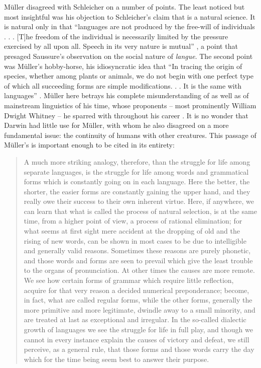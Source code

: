 \documentclass[output=paper,
modfonts
]{LSP/langsci}
\begin{document}
Müller disagreed with Schleicher on a number of points.  
The least noticed but most insightful was his objection to Schleicher's claim that  is a natural science.
It is natural only in that ``languages are not produced by the free-will of individuals . . . 
[T]he freedom of the individual is necessarily limited by the pressure exercised by all upon all. 
Speech in its very nature is mutual'' \citep[258]{muller1870}, a point that presaged Saussure's observation on the social nature of \textit{langue}. The second point was Müller's hobby-horse, his idiosyncratic idea that ``In tracing the origin of species, whether among plants or animals, we do not begin with one perfect type of which all succeeding forms are simple modifications. . . It is the same with languages'' \citep[258]{muller1870}. Müller here betrays his complete misunderstanding of  as well as of mainstream linguistics of his time, whose proponents -- most prominently William Dwight Whitney -- he sparred with throughout his career \citep{Whitney1875,alter1999}. It is no wonder that Darwin had little use for Müller, with whom he also disagreed on a more fundamental issue: the continuity of humans with other creatures. This passage of Müller's is important enough to be cited in its entirety:

\begin{quote}
A much more striking analogy, therefore, than the struggle for life among separate languages, is the struggle for life among words and grammatical forms which is constantly going on in each language. Here the better, the shorter, the easier forms are constantly gaining the upper hand, and they really owe their success to their own inherent virtue. Here, if anywhere, we can learn that what is called the process of natural selection, is at the same time, from a higher point of view, a process of rational elimination; for what seems at first sight mere accident at the dropping of old and the rising of new words, can be shown in most cases to be due to intelligible and generally valid reasons. Sometimes these reasons are purely phonetic, and those words and forms are seen to prevail which give the least trouble to the organs of pronunciation. At other times the causes are more remote. We see how certain forms of grammar which require little reflection, acquire for that very reason a decided numerical preponderance; become, in fact, what are called regular forms, while the other forms, generally the more primitive and more legitimate, dwindle away to a small minority, and are treated at last as exceptional and irregular. In the so-called dialectic growth of languages we see the struggle for life in full play, and though we cannot in every instance explain the causes of victory and defeat, we still perceive, as a general rule, that those forms and those words carry the day which for the time being seem best to answer their purpose. \citep[258]{muller1870}
\end{quote}
\end{document}
